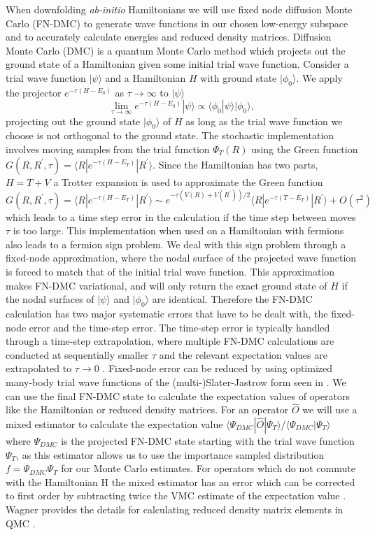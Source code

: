 \documentclass{article}
\begin{document}
When downfolding \textit{ab-initio} Hamiltonians we will use fixed node diffusion Monte Carlo (FN-DMC) to generate wave functions in our chosen low-energy subspace and to accurately calculate energies and reduced density matrices. Diffusion Monte Carlo (DMC) is a quantum Monte Carlo method which projects out the ground state of a Hamiltonian given some initial trial wave function. Consider a trial wave function $|\psi\rangle$ and a Hamiltonian $H$ with ground state $|\phi_0\rangle$. We apply the projector $e^{-\tau (H-E_0)}$ as $\tau \rightarrow \infty$ to $|\psi \rangle$
\begin{equation}
\lim_{\tau \rightarrow \infty} e^{-\tau (H-E_0)} |\psi\rangle \propto \langle \phi_0|\psi\rangle |\phi_0\rangle,
\end{equation}
projecting out the ground state $|\phi_0\rangle$ of $H$ as long as the trial wave function we choose is not orthogonal to the ground state. The stochastic implementation involves moving samples from the trial function $\Psi_T(R)$ using the Green function $G(R, R^\prime, \tau) = \langle R | e^{-\tau(H - E_T)} | R^\prime \rangle$. Since the Hamiltonian has two parts, $H = T + V$ a Trotter expansion is used to approximate the Green function $G(R, R^\prime, \tau) = \langle R | e^{-\tau(H - E_T)} | R^\prime \rangle \sim e^{-\tau(V(R) + V(R^\prime))/2} \langle R| e^{-\tau(T - E_T)}|R^\prime \rangle + O(\tau^2) $ which leads to a time step error in the calculation if the time step between moves $\tau$ is too large. This implementation when used on a Hamiltonian with fermions also leads to a fermion sign problem. We deal with this sign problem through a fixed-node approximation, where the nodal surface of the projected wave function is forced to match that of the initial trial wave function. This approximation makes FN-DMC variational, and will only return the exact ground state of $H$ if the nodal surfaces of $|\psi\rangle$ and $|\phi_0\rangle$ are identical. Therefore the FN-DMC calculation has two major systematic errors that have to be dealt with, the fixed-node error and the time-step error. The time-step error is typically handled through a time-step extrapolation, where multiple FN-DMC calculations are conducted at sequentially smaller $\tau$ and the relevant expectation values are extrapolated to $\tau \rightarrow 0$ \cite{Needs2010}. Fixed-node error can be reduced by using optimized many-body trial wave functions of the (multi-)Slater-Jastrow form seen in \cite{PhysRevLett.98.110201}. We can use the final FN-DMC state to calculate the expectation values of operators like the Hamiltonian or reduced density matrices. For an operator $\hat{O}$ we will use a mixed estimator to calculate the expectation value $\langle \Psi_{DMC} |\hat{O} | \Psi_T \rangle/\langle \Psi_{DMC} | \Psi_T \rangle$ where $\Psi_{DMC}$ is the projected FN-DMC state starting with the trial wave function $\Psi_T$, as this estimator allows us to use the importance sampled distribution $f = \Psi_{DMC}\Psi_T$ for our Monte Carlo estimates. For operators which do not commute with the Hamiltonian H the mixed estimator has an error which can be corrected to first order by subtracting twice the VMC estimate of the expectation value \cite{ceperley_kalos_1979}. Wagner provides the details for calculating reduced density matrix elements in QMC \cite{doi:10.1063/1.4793531}.
\end{document}
